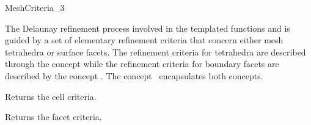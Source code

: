 \ccRefPageBegin


\begin{ccRefConcept}{MeshCriteria_3}


\ccDefinition
  
The Delaunay refinement process involved in the 
templated functions  and 
is guided by a set of elementary refinement criteria
that concern either mesh tetrahedra or surface facets.
The refinement criteria for tetrahedra are described
through the concept 
while the refinement criteria for boundary facets
are described by the concept .
The concept \ccRefName\ encapsulates both concepts.


\ccTypes
{}





\ccAccessFunctions

{Returns the cell criteria.}

{Returns the facet criteria.}



\ccHasModels
{}

\ccSeeAlso
{}\\
 \\
 \\



\end{ccRefConcept}

\ccRefPageEnd

